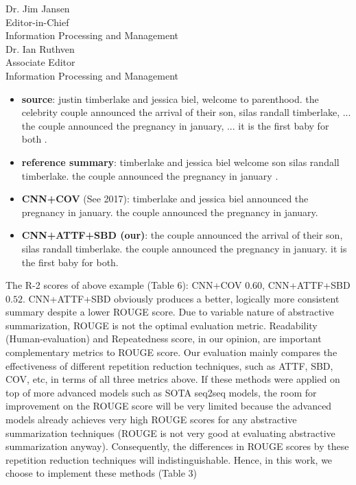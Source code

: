 \documentclass[11pt]{letter} %
\begin{document}
\begin{letter}{Dr. Jim Jansen \\
			Editor-in-Chief  \\
			Information Processing and Management\\
			Dr. Ian Ruthven \\
			Associate Editor \\
			Information Processing and Management}
\begin{enumerate}
\begin{itemize}
\begin{itemize}
\begin{itemize}
					\item 
					\textbf{source}: \small{justin timberlake and jessica biel, welcome to parenthood. 
	                        the celebrity couple announced the arrival of their son,
			                silas randall timberlake, ...
			                the couple announced the pregnancy in january, ...
			                it is the first baby for both .}
                   \item 
	               \textbf{reference summary}: \small{timberlake and jessica biel welcome son silas 
                   	                   randall timberlake. the couple announced the 
					                   pregnancy in january .}
                   \item 
	               \textbf{CNN+COV} (See 2017): \small{timberlake and jessica biel announced 
	                                    the pregnancy in january. 
                                        the couple announced the pregnancy in january. }
                   \item 
				   \textbf{CNN+ATTF+SBD (our)}: \small{the couple announced the arrival of their son, 
	                                      silas randall timberlake. the couple announced the 
					                      pregnancy in january. it is the first baby for both.}
                \end{itemize}
                The R-2 scores of above example (Table 6): CNN+COV $0.60$, CNN+ATTF+SBD $0.52$.
                CNN+ATTF+SBD obviously produces a better, logically more consistent summary despite 
                a lower ROUGE score.  
                Due to variable nature of abstractive summarization, 
				ROUGE is not the optimal evaluation metric.
				Readability (Human-evaluation) and Repeatedness score, 
                in our opinion, are important complementary metrics to ROUGE score.  
                Our evaluation mainly compares 
				the effectiveness of different repetition reduction techniques,
                such as ATTF, SBD, COV, etc, in terms of all three metrics above. 
				If these methods were applied on top of more advanced models 
				such as SOTA seq2seq models,
				the room for improvement on the ROUGE score will be
				very limited because the advanced models already achieves 
				very high ROUGE scores for any abstractive summarization techniques 
				(ROUGE is not very good at evaluating abstractive summarization anyway). 
				Consequently, the differences in ROUGE scores 
				by these repetition reduction techniques will indistinguishable. 
				Hence, in this work, we choose to implement these methods (Table 3) 

\end{itemize}
\end{itemize}
\end{enumerate}
\end{letter}
\end{document}
